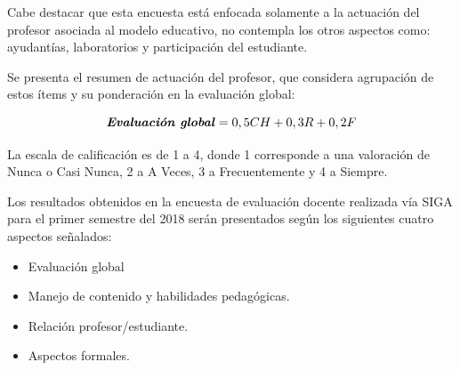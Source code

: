 \documentclass[12pt]{article}
\begin{document}
\begin{text}
Cabe destacar que esta encuesta está enfocada solamente a la actuación del profesor asociada al modelo educativo, no contempla los otros aspectos como: ayudantías, laboratorios y participación del estudiante.\par
Se presenta el resumen de actuación del profesor, que considera agrupación de estos ítems y su ponderación en la evaluación global:
\end{text}

\begin{equation}
    \textbf{\textit{Evaluación global}} = 0,5CH + 0,3R + 0,2F
    \label{equation:ecuacionEG}
\end{equation}

\begin{table}[H]
\end{table}


\begin{text}
La escala de calificación es de 1 a 4, donde 1 corresponde a una valoración de Nunca o Casi Nunca, 2 a A Veces, 3 a Frecuentemente y 4 a Siempre. 
\par
Los resultados obtenidos en la encuesta de evaluación docente realizada vía SIGA para el primer semestre del 2018 serán presentados según los siguientes cuatro aspectos señalados:
\end{text}
\begin{itemize}
    \item Evaluación global
    \item Manejo de contenido y habilidades pedagógicas.
    \item Relación profesor/estudiante.
    \item Aspectos formales.
\end{itemize}
\end{document}
